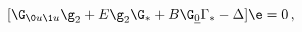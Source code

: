 \begin{equation} \label{ksym}
[\G_{\0u\1u}\g_{2} + E \g_2 \G_* +B \G_{\underline{0}}\Gamma
_*-\Delta]\e=0\,,
\end{equation}

